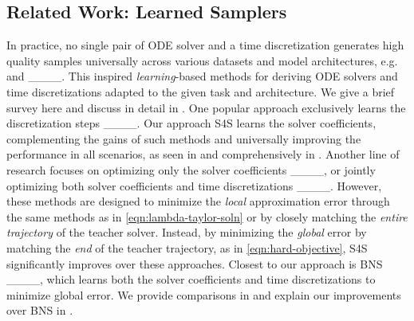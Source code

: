 \subsection{Related Work: Learned Samplers} 
In practice, no single pair of ODE solver and a time discretization generates high quality samples universally across various datasets and model architectures, e.g.  and ____.
This inspired {\em learning}-based methods for deriving ODE solvers and time discretizations adapted to the given task and architecture.
We give a brief survey here and discuss in detail in . 
One popular approach exclusively learns the discretization steps ____. 
Our approach S4S learns the solver coefficients, complementing the gains of such methods and universally improving the performance in all scenarios, as seen in  and comprehensively in .
Another line of research focuses on optimizing only the solver coefficients ____, or jointly optimizing both solver coefficients and time discretizations ____.  
However, these methods are designed to minimize the {\em local} approximation error through the same methods as in \eqref{eqn:lambda-taylor-soln} or by closely matching the \emph{entire trajectory} of the teacher solver.
Instead, by minimizing the \emph{global} error by matching the \emph{end} of the teacher trajectory, as in \eqref{eqn:hard-objective}, S4S significantly improves over these approaches.
Closest to our approach is BNS ____, which learns both the solver coefficients and time discretizations to minimize global error.
We provide comparisons in  and explain our improvements over BNS in .